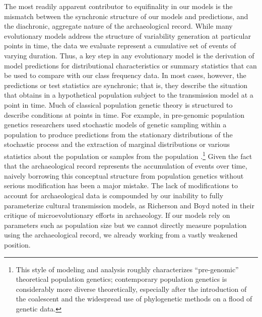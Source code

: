 The most readily apparent contributor to equifinality in our models is the mismatch between the synchronic structure of our models and predictions, and the diachronic, aggregate nature of the archaeological record. While many evolutionary models address the structure of variability generation at particular points in time, the data we evaluate represent a cumulative set of events of varying duration.  Thus, a key step in any evolutionary model is the derivation of model predictions for distributional characteristics or summary statistics that can be used to compare with our class frequency data. In most cases, however, the predictions or test statistics are synchronic; that is, they describe the situation that obtains in a hypothetical population subject to the transmission model at a point in time. Much of classical population genetic theory is structured to describe conditions at points in time.  For example, in pre-genomic population genetics researchers used stochastic models of genetic sampling within a population to produce predictions from the stationary distributions of the stochastic process and the extraction of marginal distributions or various statistics about the population or samples from the population .\footnote{This style of modeling and analysis roughly characterizes ``pre-genomic'' theoretical population genetics; contemporary population genetics is considerably more diverse theoretically, especially after the introduction of the coalescent \citep{Wakeley2008} and the widespread use of phylogenetic methods on a flood of genetic data.}   Given the fact that the archaeological record represents the accumulation of events over time, naively borrowing this conceptual structure from population genetics without serious modification has been a major mistake. The lack of modifications to account for archaeological data is compounded by our inability to fully parameterize cultural transmission models, as Richerson and Boyd \citeyearpar[301-302]{Boyd2008} noted in their critique of microevolutionary efforts in archaeology. If our models rely on parameters such as population size but we cannot directly measure population using the archaeological record, we already working from a vastly weakened position. 

